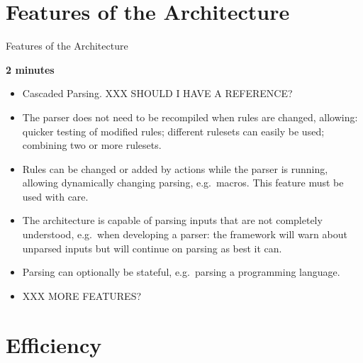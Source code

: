 \documentclass{beamer}
\newcommand{\timingnote}[1]{%
    \textbf{#1}%
}
\begin{document}
\section{Features of the Architecture}

\begin{frame}{Features of the Architecture}

    \timingnote{2 minutes}

    \begin{itemize}

        \item Cascaded Parsing.  XXX SHOULD I HAVE A REFERENCE\@?

        \item The parser does not need to be recompiled when rules are
            changed, allowing: quicker testing of modified rules; different
            rulesets can easily be used; combining two or more rulesets.

        \item Rules can be changed or added by actions while the parser is
            running, allowing dynamically changing parsing, e.g.\ macros.
            This feature must be used with care.

        \item The architecture is capable of parsing inputs that are not
            completely understood, e.g.\ when developing a parser: the
            framework will warn about unparsed inputs but will continue on
            parsing as best it can.

        \item Parsing can optionally be stateful, e.g.\ parsing a
            programming language.

        \item XXX MORE FEATURES\@?

    \end{itemize}

\end{frame}


\section{Efficiency}
\end{document}
